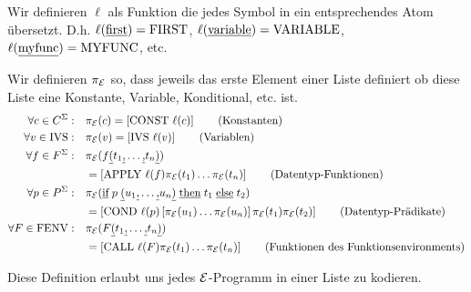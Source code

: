 Wir definieren $\ell$ als Funktion die jedes Symbol in ein entsprechendes Atom übersetzt. D.h. $\ell(\text{\underline{first}})=\text{FIRST}$, $\ell(\text{\underline{variable}}) = \text{VARIABLE}$, $\ell(\text{\underline{myfunc}}) = \text{MYFUNC}$, etc.
\begin{defn}
Wir definieren $\pi_{\mathcal{E}}$ so, dass jeweils das erste Element einer Liste definiert ob diese Liste eine
Konstante, Variable, Konditional, etc. ist.
\begin{align*}
\text{$\forall$} c \in C^{\Sigma}: \quad &\pi_{\mathcal{E}}(c)= \left[\text{CONST } \ell(c)\right] \tag{Konstanten}\\
\text{$\forall$} v \in \text{IVS}: \quad &\pi_{\mathcal{E}}(v)= \left[\text{IVS } \ell(v)\right] \tag{Variablen}\\
\text{$\forall$} f \in F^{\Sigma}: \quad &\pi_{\mathcal{E}}(f\text{\underline{(}}t_1\text{\underline{,}}\ldots\text{\underline{,}}t_n\text{\underline{)}}) \\
&= \left[\text{APPLY } \ell(f) \pi_{\mathcal{E}}(t_1) \ldots \pi_{\mathcal{E}}(t_n)\right] \tag{Datentyp-Funktionen}\\
\text{$\forall$} p \in P^{\Sigma}: \quad &\pi_{\mathcal{E}}(\text{\underline{if}}\;p\;\text{\underline{(}}u_1\text{\underline{,}}\ldots\text{\underline{,}}u_n\text{\underline{)}}\;\text{\underline{then}}\;t_1\;\text{\underline{else}}\;t_2) \\
&= \left[\text{COND } \ell(p) \left[ \pi_{\mathcal{E}}(u_1) \ldots \pi_{\mathcal{E}}(u_n)\right] \pi_{\mathcal{E}}(t_1) \pi_{\mathcal{E}}(t_2)\right] \tag{Datentyp-Prädikate}\\
\text{$\forall$} F \in \text{FENV}: \quad &\pi_{\mathcal{E}}(F\text{\underline{(}}t_1\text{\underline{,}}\ldots\text{\underline{,}}t_n\text{\underline{)}}) \\
&= \left[\text{CALL } \ell(F) \pi_{\mathcal{E}}(t_1) \ldots \pi_{\mathcal{E}}(t_n)\right] \tag{Funktionen des Funktionsenvironments}
\end{align*}
\end{defn}

Diese Definition erlaubt uns jedes $\mathcal{E}$-Programm in einer Liste zu kodieren.

